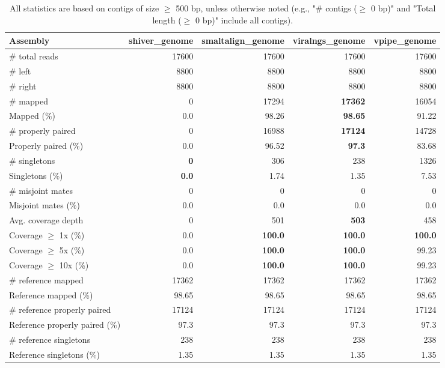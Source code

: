 \documentclass[12pt,a4paper]{article}
\begin{document}
\begin{table}[ht]
\begin{center}
\caption{All statistics are based on contigs of size $\geq$ 500 bp, unless otherwise noted (e.g., "\# contigs ($\geq$ 0 bp)" and "Total length ($\geq$ 0 bp)" include all contigs).}
\begin{tabular}{|l*{4}{|r}|}
\hline
Assembly & shiver\_genome & smaltalign\_genome & viralngs\_genome & vpipe\_genome \\ \hline
\# total reads & 17600 & 17600 & 17600 & 17600 \\ \hline
\# left & 8800 & 8800 & 8800 & 8800 \\ \hline
\# right & 8800 & 8800 & 8800 & 8800 \\ \hline
\# mapped & 0 & 17294 & {\bf 17362} & 16054 \\ \hline
Mapped (\%) & 0.0 & 98.26 & {\bf 98.65} & 91.22 \\ \hline
\# properly paired & 0 & 16988 & {\bf 17124} & 14728 \\ \hline
Properly paired (\%) & 0.0 & 96.52 & {\bf 97.3} & 83.68 \\ \hline
\# singletons & {\bf 0} & 306 & 238 & 1326 \\ \hline
Singletons (\%) & {\bf 0.0} & 1.74 & 1.35 & 7.53 \\ \hline
\# misjoint mates & 0 & 0 & 0 & 0 \\ \hline
Misjoint mates (\%) & 0.0 & 0.0 & 0.0 & 0.0 \\ \hline
Avg. coverage depth & 0 & 501 & {\bf 503} & 458 \\ \hline
Coverage $\geq$ 1x (\%) & 0.0 & {\bf 100.0} & {\bf 100.0} & {\bf 100.0} \\ \hline
Coverage $\geq$ 5x (\%) & 0.0 & {\bf 100.0} & {\bf 100.0} & 99.23 \\ \hline
Coverage $\geq$ 10x (\%) & 0.0 & {\bf 100.0} & {\bf 100.0} & 99.23 \\ \hline
\# reference mapped & 17362 & 17362 & 17362 & 17362 \\ \hline
Reference mapped (\%) & 98.65 & 98.65 & 98.65 & 98.65 \\ \hline
\# reference properly paired & 17124 & 17124 & 17124 & 17124 \\ \hline
Reference properly paired (\%) & 97.3 & 97.3 & 97.3 & 97.3 \\ \hline
\# reference singletons & 238 & 238 & 238 & 238 \\ \hline
Reference singletons (\%) & 1.35 & 1.35 & 1.35 & 1.35 \\ \hline

\end{tabular}
\end{center}
\end{table}
\end{document}
